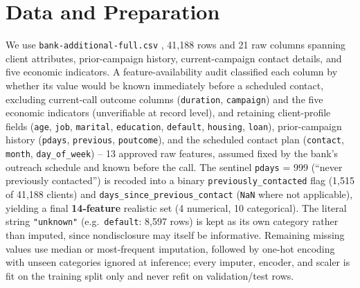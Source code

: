 \documentclass{article}
\begin{document}
\section{Data and Preparation}
We use \texttt{bank-additional-full.csv} \citep{moro2014data,moro2012uci},
41{,}188 rows and 21 raw columns spanning client attributes, prior-campaign
history, current-campaign contact details, and five economic indicators. A
feature-availability audit classified each column by whether its value would
be known immediately before a scheduled contact, excluding current-call
outcome columns (\texttt{duration}, \texttt{campaign}) and the five economic
indicators (unverifiable at record level), and retaining client-profile fields (\texttt{age}, \texttt{job}, \texttt{marital},
\texttt{education}, \texttt{default}, \texttt{housing}, \texttt{loan}),
prior-campaign history (\texttt{pdays}, \texttt{previous}, \texttt{poutcome}),
and the scheduled contact plan (\texttt{contact}, \texttt{month},
\texttt{day\_of\_week}) -- 13 approved raw features, assumed fixed by the
bank's outreach schedule and known before the call. The sentinel
\texttt{pdays} = 999 (``never previously contacted'') is recoded into a
binary \texttt{previously\_contacted} flag (1{,}515 of 41{,}188 clients) and
\texttt{days\_since\_previous\_contact} (\texttt{NaN} where not applicable),
yielding a final \textbf{14-feature} realistic set (4 numerical, 10
categorical). The literal string \texttt{"unknown"} (e.g.\ \texttt{default}:
8{,}597 rows) is kept as its own category rather than imputed, since
nondisclosure may itself be informative. Remaining missing values use median
or most-frequent imputation, followed by one-hot encoding with unseen
categories ignored at inference; every imputer, encoder, and scaler is fit
on the training split only and never refit on validation/test rows.
\end{document}
